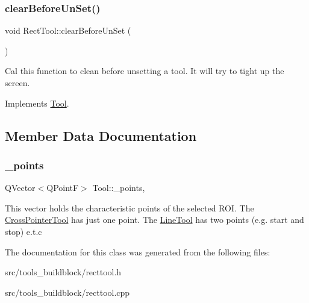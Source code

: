 \subsubsection{\texorpdfstring{clear\+Before\+Un\+Set()}{clearBeforeUnSet()}}
{\footnotesize\ttfamily void Rect\+Tool\+::clear\+Before\+Un\+Set (\begin{DoxyParamCaption}{ }\end{DoxyParamCaption})\hspace{0.3cm}{\ttfamily [virtual]}}

Cal this function to clean before unsetting a tool. It will try to tight up the screen. 

Implements \mbox{\hyperlink{classTool_a7d9e7d03f4a34d71850cbbfc16ca8532}{Tool}}.



\subsection{Member Data Documentation}
\mbox{\label{classTool_a68be77a2e364a7b13d7206388ba5843e}} 
\subsubsection{\texorpdfstring{\+\_\+points}{\_points}}
{\footnotesize\ttfamily Q\+Vector$<$Q\+PointF$>$ Tool\+::\+\_\+points\hspace{0.3cm}{\ttfamily [protected]}, {\ttfamily [inherited]}}

This vector holds the characteristic points of the selected R\+OI. The \mbox{\hyperlink{classCrossPointerTool}{Cross\+Pointer\+Tool}} has just one point. The \mbox{\hyperlink{classLineTool}{Line\+Tool}} has two points (e.\+g. start and stop) e.\+t.\+c 

The documentation for this class was generated from the following files\+:\begin{DoxyCompactItemize}
\item 
src/tools\+\_\+buildblock/recttool.\+h\item 
src/tools\+\_\+buildblock/recttool.\+cpp\end{DoxyCompactItemize}
